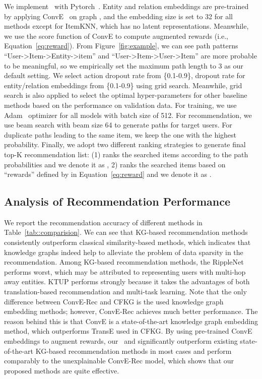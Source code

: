 We implement \name\ with Pytorch~\cite{paszke2017automatic}. 
Entity and relation embeddings are pre-trained by applying ConvE~\cite{dettmers2018convolutional}
on graph ,
and the embedding size is set to 32 for all methods except for ItemKNN, which has no latent representations. Meanwhile, we use the score function of ConvE to compute augmented rewards (i.e., Equation~\ref{eq:reward}). 
From Figure~\ref{fig:example}, we can see path patterns ``User->Item->Entity->item'' and ``User->Item->User->Item'' are more probable to be meaningful, so we empirically set the maximum path length  to 3 as our default setting. We select action dropout rate from \{0.1-0.9\}, dropout rate for entity/relation embeddings from \{0.1-0.9\} using grid search.
Meanwhile, grid search is also applied to select the optimal hyper-parameters for other baseline methods based on the performance on validation data.
For training, we use Adam~\cite{kingma2014adam} optimizer for all models with batch size of 512.
For recommendation, we use beam search with beam size 64 to generate paths for target users. For duplicate paths leading to the same item, we keep the one with the highest probability. 
Finally, we adopt two different ranking strategies to generate final top-K recommendation list: (1) ranks the searched items according to the path probabilities and we denote it as \name, 2) ranks the searched items based on ``rewards'' defined by  in Equation~\ref{eq:reward} and we denote it as \name*.



\subsection{Analysis of Recommendation Performance}
We report the recommendation accuracy of different methods in Table~\ref{tab::comparision}. We can see that KG-based recommendation methods consistently outperform classical similarity-based methods, which indicates that knowledge graphs indeed help to alleviate the problem of data sparsity in the recommendation. Among KG-based recommendation methods, the RippleNet performs worst, which may be attributed to representing users with multi-hop away entities. KTUP performs strongly because it takes the advantages of both translation-based recommendation and multi-task learning. Note that the only difference between ConvE-Rec and CFKG is the used knowledge graph embedding methods; however, ConvE-Rec achieves much better performance. The reason behind this is that ConvE is a state-of-the-art knowledge graph embedding method, which outperforms TransE used in CFKG. By using pre-trained ConvE embeddings to augment rewards, our \name\ and \name* significantly outperform existing state-of-the-art KG-based recommendation methods in most cases and perform comparably to the unexplainable ConvE-Rec model, which shows that our proposed methods are quite effective.  






